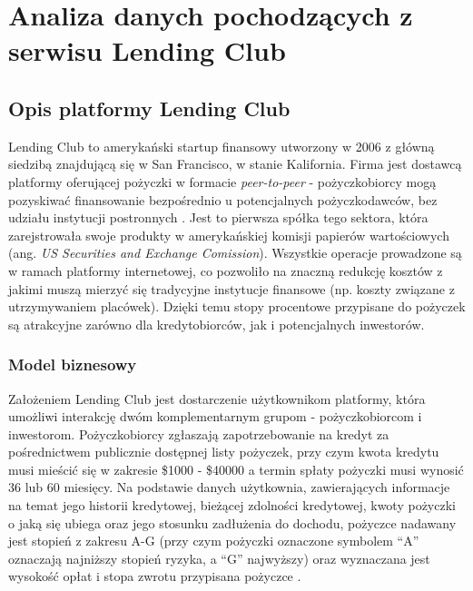 \chapter{Analiza danych pochodzących z serwisu Lending Club}

\section{Opis platformy Lending Club}

Lending Club to amerykański startup finansowy utworzony w 2006 z główną siedzibą znajdującą się w San Francisco, w stanie Kalifornia. Firma jest dostawcą platformy oferującej pożyczki w formacie \textit{peer-to-peer} - pożyczkobiorcy mogą pozyskiwać finansowanie bezpośrednio u potencjalnych pożyczkodawców, bez udziału instytucji postronnych \cite{LendingClub}. Jest to pierwsza spółka tego sektora, która zarejstrowała swoje produkty w amerykańskiej komisji papierów wartościowych (ang. \textit{US Securities and Exchange Comission}). Wszystkie operacje prowadzone są w ramach platformy internetowej, co pozwoliło na znaczną redukcję kosztów z jakimi muszą mierzyć się tradycyjne instytucje finansowe (np. koszty związane z utrzymywaniem placówek). Dzięki temu stopy procentowe przypisane do pożyczek są atrakcyjne zarówno dla kredytobiorców, jak i potencjalnych inwestorów. 

\subsection{Model biznesowy}

Założeniem Lending Club jest dostarczenie użytkownikom platformy, która umożliwi interakcję dwóm komplementarnym grupom - pożyczkobiorcom i inwestorom. Pożyczkobiorcy zgłaszają zapotrzebowanie na kredyt za pośrednictwem publicznie dostępnej listy pożyczek, przy czym kwota kredytu musi mieścić się w zakresie \$1000 - \$40000 a termin spłaty pożyczki musi wynosić 36 lub 60 miesięcy. Na podstawie danych użytkownia, zawierających informacje na temat jego historii kredytowej, bieżącej zdolności kredytowej, kwoty pożyczki o jaką się ubiega oraz jego stosunku zadłużenia do dochodu, pożyczce nadawany jest stopień z zakresu A-G (przy czym pożyczki oznaczone symbolem ``A'' oznaczają najniższy stopień ryzyka, a ``G'' najwyższy) oraz wyznaczana jest wysokość opłat i stopa zwrotu przypisana pożyczce \cite{LendingClub}. 

